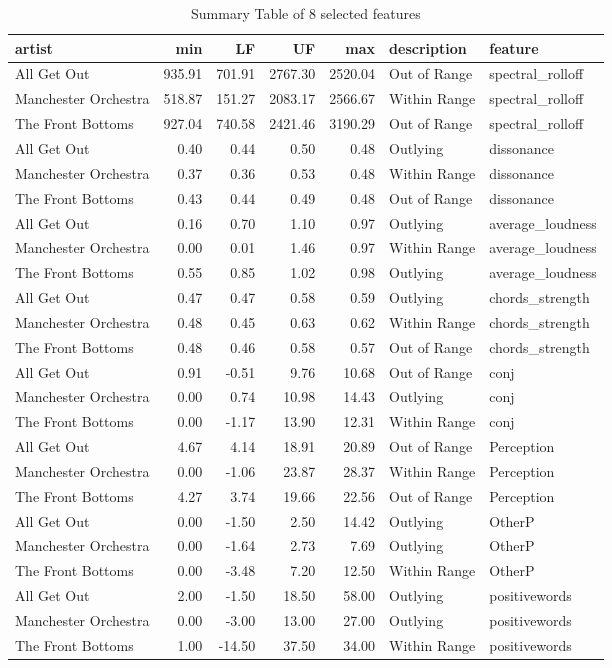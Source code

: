 \documentclass{article}\usepackage[]{graphicx}\usepackage[]{xcolor}
\begin{document}
\begin{table}[ht]
\centering
\caption{Summary Table of 8 selected features}
\begin{tabular}{lrrrrll}
  \hline
artist & min & LF & UF & max & description & feature \\ 
  \hline
All Get Out & 935.91 & 701.91 & 2767.30 & 2520.04 & Out of Range & spectral\_rolloff \\ 
  Manchester Orchestra & 518.87 & 151.27 & 2083.17 & 2566.67 & Within Range & spectral\_rolloff \\ 
  The Front Bottoms & 927.04 & 740.58 & 2421.46 & 3190.29 & Out of Range & spectral\_rolloff \\ 
  All Get Out & 0.40 & 0.44 & 0.50 & 0.48 & Outlying & dissonance \\ 
  Manchester Orchestra & 0.37 & 0.36 & 0.53 & 0.48 & Within Range & dissonance \\ 
  The Front Bottoms & 0.43 & 0.44 & 0.49 & 0.48 & Out of Range & dissonance \\ 
  All Get Out & 0.16 & 0.70 & 1.10 & 0.97 & Outlying & average\_loudness \\ 
  Manchester Orchestra & 0.00 & 0.01 & 1.46 & 0.97 & Within Range & average\_loudness \\ 
  The Front Bottoms & 0.55 & 0.85 & 1.02 & 0.98 & Outlying & average\_loudness \\ 
  All Get Out & 0.47 & 0.47 & 0.58 & 0.59 & Outlying & chords\_strength \\ 
  Manchester Orchestra & 0.48 & 0.45 & 0.63 & 0.62 & Within Range & chords\_strength \\ 
  The Front Bottoms & 0.48 & 0.46 & 0.58 & 0.57 & Out of Range & chords\_strength \\ 
  All Get Out & 0.91 & -0.51 & 9.76 & 10.68 & Out of Range & conj \\ 
  Manchester Orchestra & 0.00 & 0.74 & 10.98 & 14.43 & Outlying & conj \\ 
  The Front Bottoms & 0.00 & -1.17 & 13.90 & 12.31 & Within Range & conj \\ 
  All Get Out & 4.67 & 4.14 & 18.91 & 20.89 & Out of Range & Perception \\ 
  Manchester Orchestra & 0.00 & -1.06 & 23.87 & 28.37 & Within Range & Perception \\ 
  The Front Bottoms & 4.27 & 3.74 & 19.66 & 22.56 & Out of Range & Perception \\ 
  All Get Out & 0.00 & -1.50 & 2.50 & 14.42 & Outlying & OtherP \\ 
  Manchester Orchestra & 0.00 & -1.64 & 2.73 & 7.69 & Outlying & OtherP \\ 
  The Front Bottoms & 0.00 & -3.48 & 7.20 & 12.50 & Within Range & OtherP \\ 
  All Get Out & 2.00 & -1.50 & 18.50 & 58.00 & Outlying & positivewords \\ 
  Manchester Orchestra & 0.00 & -3.00 & 13.00 & 27.00 & Outlying & positivewords \\ 
  The Front Bottoms & 1.00 & -14.50 & 37.50 & 34.00 & Within Range & positivewords \\ 
   \hline
\end{tabular}
\end{table}
\end{document}
